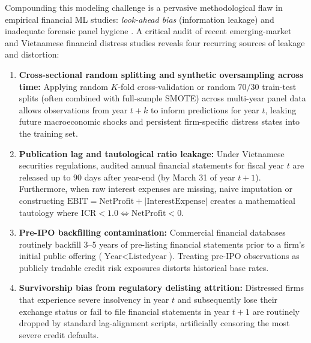 \documentclass[pdflatex,sn-mathphys-num,twocolumn]{sn-jnl}
\theoremstyle{thmstyleone}
\theoremstyle{thmstyletwo}
\theoremstyle{thmstylethree}
\begin{document}
Compounding this modeling challenge is a pervasive methodological flaw in empirical financial ML studies: \textit{look-ahead bias} (information leakage) and inadequate forensic panel hygiene \citep{bailey2014pseudo,lopez2018advances}. A critical audit of recent emerging-market and Vietnamese financial distress studies \citep[e.g.,][]{pham2018financial,vo2019corporate,tran2022explainable,tran2023examining,vu2023lasso} reveals four recurring sources of leakage and distortion:
\begin{enumerate}
    \item \textbf{Cross-sectional random splitting and synthetic oversampling across time:} Applying random $K$-fold cross-validation or random $70/30$ train-test splits (often combined with full-sample SMOTE) across multi-year panel data allows observations from year $t+k$ to inform predictions for year $t$, leaking future macroeconomic shocks and persistent firm-specific distress states into the training set.
    \item \textbf{Publication lag and tautological ratio leakage:} Under Vietnamese securities regulations, audited annual financial statements for fiscal year $t$ are released up to 90 days after year-end (by March 31 of year $t+1$). Furthermore, when raw interest expenses are missing, naive imputation or constructing $\text{EBIT} = \text{NetProfit} + |\text{InterestExpense}|$ creates a mathematical tautology where $\text{ICR} < 1.0 \iff \text{NetProfit} < 0$.
    \item \textbf{Pre-IPO backfilling contamination:} Commercial financial databases routinely backfill 3--5 years of pre-listing financial statements prior to a firm's initial public offering ($\text{Year} < \text{Listedyear}$). Treating pre-IPO observations as publicly tradable credit risk exposures distorts historical base rates.
    \item \textbf{Survivorship bias from regulatory delisting attrition:} Distressed firms that experience severe insolvency in year $t$ and subsequently lose their exchange status or fail to file financial statements in year $t+1$ are routinely dropped by standard lag-alignment scripts, artificially censoring the most severe credit defaults.
\end{enumerate}
\end{document}
